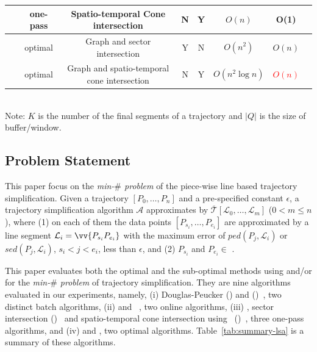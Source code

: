 \begin{table}
\begin{tabular}{|l|c|c|c|c|c|c|c|}
		\cised~\cite{Lin:Cised}	&one-pass	& Spatio-temporal Cone intersection        &N & Y & $O(n)$ & O(1) \\		\hline
		\oped~\cite{Chan:Optimal}	&optimal	& Graph and sector intersection    &Y & N & $O(n^2)$	& {$O(n)$} \\		\hline
		\osed~	&optimal	&Graph and spatio-temporal cone intersection&N & Y  & $O(n^2 \log n)$	& \textcolor{red}{$O(n)$} \\		\hline
	\end{tabular}
	{\\  Note: $K$ is the number of the final segments of a trajectory and $|Q|$ is the size of buffer/window.}
\end{table}


\subsection{Problem Statement}
This paper focus on the \emph{min-$\#$ problem} \cite{Chan:Optimal, Imai:Optimal,Pavlidis:Segment} of the piece-wise line based trajectory simplification.
%
Given a trajectory $[P_0, \dots, P_n]$ and a pre-specified constant $\epsilon$, a trajectory simplification algorithm $\mathcal{A}$ approximates  by $\overline{\mathcal{T}}[\mathcal{L}_0, \ldots , \mathcal{L}_m]$ ($0< m \le n$), where 
(1) on each of them the data points $[P_{s_i}, \dots, P_{e_i}]$ are approximated by a line segment $\mathcal{L}_i = \vv{P_{s_i}P_{e_i}}$ with the maximum error of  $ped(P_j, \mathcal{L}_i)$ or $sed(P_j, \mathcal{L}_i)$, $s_i < j<e_i$,  less than $\epsilon$, and 	%
(2) $P_{s_i}$ and $P_{e_i} \in$ . 	%

This paper evaluates both the optimal and the sub-optimal methods using \ped and/or \sed for the \emph{min-$\#$ problem} of trajectory simplification.
They are nine \lsa algorithms evaluated in our experiments, namely,
(i) Douglas-Peucker (\dpa)\cite{Douglas:Peucker,Meratnia:Spatiotemporal} and \pavlidis (\tpa)~\cite{Pavlidis:Segment}, two distinct batch algorithms,
(ii) \bqsa\cite{Liu:BQS} and \squishe~\cite{Muckell:SQUISH}, two online algorithms, %
(iii) \operb\cite{Lin:Operb}, sector intersection (\siped)~\cite{Williams:Longest,Sklansky:Cone,Dunham:Cone, Zhao:Sleeve} and spatio-temporal cone intersection using \sed~(\cised)~\cite{Lin:Cised}, three one-pass algorithms, and 
(iv) \oped\cite{Chan:Optimal} and \osed, two optimal \lsa algorithms.
%
Table~\ref{tab:summary-lsa} is a summary of these algorithms.




